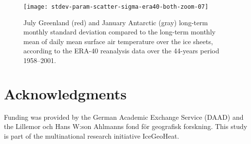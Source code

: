 \documentclass[review]{igs}
\begin{document}
\begin{figure}
    \centering\texttt{[image: stdev-param-scatter-sigma-era40-both-zoom-07]}
    \caption{July Greenland (red) and January Antarctic (gray) long-term monthly standard deviation compared to the long-term monthly mean of daily mean surface air temperature over the ice sheets, according to the ERA-40 reanalysis data \citep{uppala-etal-2005} over the 44-years period 1958–2001.}
    \label{fig:both}
\end{figure}


\section{Acknowledgments}

Funding was provided by the German Academic Exchange Service (DAAD) and the Lillemor och Hans W:son Ahlmanns fond för geografisk forskning. This study is part of the multinational research initiative IceGeoHeat.



\end{document}
